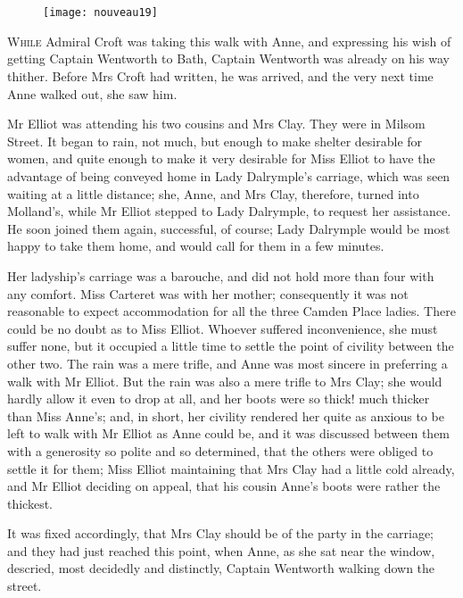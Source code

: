 \chapter[Chapter \thechapter]{}

\begin{figure}[t!]
\centering
\texttt{[image: nouveau19]}
\end{figure}

\lettrine[lraise=0.3]{W}{hile} Admiral Croft was taking this walk with Anne, and expressing his wish of getting Captain Wentworth to Bath, Captain Wentworth was already on his way thither. Before Mrs Croft had written, he was arrived, and the very next time Anne walked out, she saw him.

Mr Elliot was attending his two cousins and Mrs Clay. They were in Milsom Street. It began to rain, not much, but enough to make shelter desirable for women, and quite enough to make it very desirable for Miss Elliot to have the advantage of being conveyed home in Lady Dalrymple's carriage, which was seen waiting at a little distance; she, Anne, and Mrs Clay, therefore, turned into Molland's, while Mr Elliot stepped to Lady Dalrymple, to request her assistance. He soon joined them again, successful, of course; Lady Dalrymple would be most happy to take them home, and would call for them in a few minutes.

Her ladyship's carriage was a barouche, and did not hold more than four with any comfort. Miss Carteret was with her mother; consequently it was not reasonable to expect accommodation for all the three Camden Place ladies. There could be no doubt as to Miss Elliot. Whoever suffered inconvenience, she must suffer none, but it occupied a little time to settle the point of civility between the other two. The rain was a mere trifle, and Anne was most sincere in preferring a walk with Mr Elliot. But the rain was also a mere trifle to Mrs Clay; she would hardly allow it even to drop at all, and her boots were so thick! much thicker than Miss Anne's; and, in short, her civility rendered her quite as anxious to be left to walk with Mr Elliot as Anne could be, and it was discussed between them with a generosity so polite and so determined, that the others were obliged to settle it for them; Miss Elliot maintaining that Mrs Clay had a little cold already, and Mr Elliot deciding on appeal, that his cousin Anne's boots were rather the thickest.

It was fixed accordingly, that Mrs Clay should be of the party in the carriage; and they had just reached this point, when Anne, as she sat near the window, descried, most decidedly and distinctly, Captain Wentworth walking down the street.

